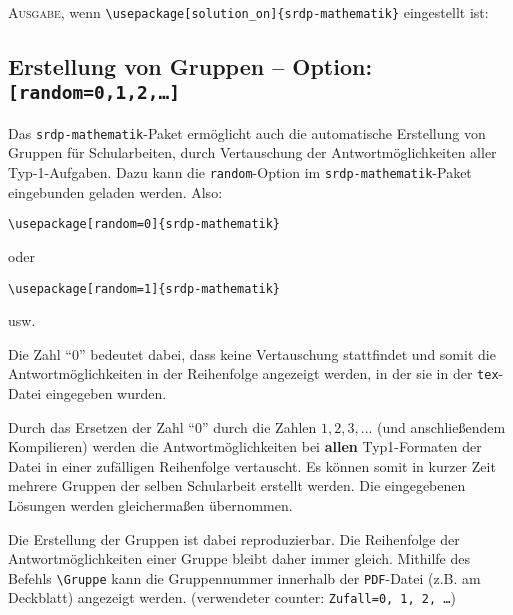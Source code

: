 \documentclass[a4paper,12pt]{article}
\begin{document}
\textsc{Ausgabe}, wenn \texttt{\textbackslash usepackage[solution\_on]\{srdp-mathematik\}} eingestellt ist:\\

\setcounter{Antworten}{1}


\subsection{Erstellung von Gruppen -- Option: \texttt{[random=0,1,2,\ldots]}}
Das \texttt{srdp-mathematik}-Paket ermöglicht auch die automatische Erstellung von Gruppen für Schularbeiten, durch Vertauschung der Antwortmöglichkeiten aller Typ-1-Aufgaben. Dazu kann die \texttt{random}-Option im \texttt{srdp-mathematik}-Paket eingebunden geladen werden. Also:

\begin{verbatim}
\usepackage[random=0]{srdp-mathematik}
\end{verbatim}

oder

\begin{verbatim}
\usepackage[random=1]{srdp-mathematik}
\end{verbatim}

usw.

Die Zahl "`0"' bedeutet dabei, dass keine Vertauschung stattfindet und somit die Antwortmöglichkeiten in der Reihenfolge angezeigt werden, in der sie in der \texttt{tex}-Datei eingegeben wurden. 

Durch das Ersetzen der Zahl "`0"' durch die Zahlen $1, 2, 3, \ldots$ (und anschließendem Kompilieren) werden die Antwortmöglichkeiten bei \textbf{allen} Typ1-Formaten der Datei in einer zufälligen Reihenfolge vertauscht. Es können somit in kurzer Zeit mehrere Gruppen der selben Schularbeit erstellt werden. Die eingegebenen Lösungen werden gleichermaßen übernommen. \leer

Die Erstellung der Gruppen ist dabei reproduzierbar. Die Reihenfolge der Antwortmöglichkeiten einer Gruppe bleibt daher immer gleich. Mithilfe des Befehls \texttt{\textbackslash Gruppe} kann die Gruppennummer innerhalb der \texttt{PDF}-Datei (z.B. am Deckblatt) angezeigt werden. (verwendeter counter: \texttt{Zufall=0, 1, 2, \ldots})
\end{document}
